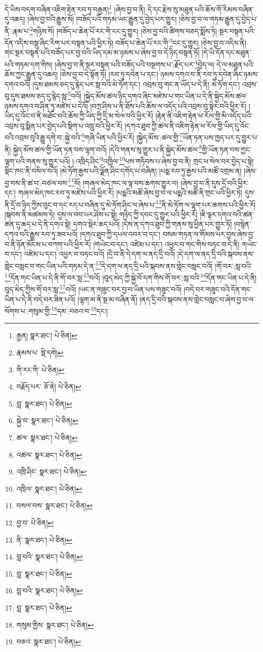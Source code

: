 དེ་ཡིས་བདག་བཞིན་འཇིག་རྟེན་རབ་ཏུ་བརྒྱན།\footnote{རྒྱན།  སྣར་ཐང་།  པེ་ཅིན། } །ཞེས་བྱ་བ་ནི། དེ་དང་རྗེས་སུ་མཐུན་པའི་ཆོས་གོ་རིམས་བཞིན་དུ་འཆད། །ཞེས་བྱ་བའི་རྒྱུས་སོ། །བཟོད་པའི་གཏམ་ཡང་རྒྱུན་དུ་བྱེད་པར་གྱུར། །ཅེས་བྱ་བ་ལ་གཏམ་རྒྱུན་དུ་བྱེད་པ་ནི་:རྣམ་པ་\footnote{རྣམས་པ་  སྡེ་དགེ། }གཉིས་སོ། །བཟོད་པ་ཆེན་པོ་རང་གི་ངང་དུ་གྱུར། །ཅེས་བྱ་བའི་ཚིགས་བཅད་སྨོས་ཏེ། སྔར་བསྟན་པའི་དོན་འདིས་བསྡུ་ཞིང་རིག་པར་བསྟན་པའི་ཕྱིར་ཏེ། བཟོད་པ་ཆེན་པོ་རང་གི་\footnote{གི་རང་གི་  པེ་ཅིན། }ངང་དུ་གྱུར། །ཅེས་བྱ་བ་འདིས་ནི། གང་སྔར་བསྟན་པའི་བཟོད་པར་བྱ་བའི་ཡིད་དམ་མ་ཉམས་པ་ཞེས་བྱ་བ་དེ་ཉིད་བསྟན་ཏོ། །དེ་ཡི་དོན་དང་མཐུན་པའི་གཏམ་དག་གིས། །ཞེས་བྱ་བ་ནི་སྔར་བསྟན་པའི་བཟོད་པའི་བསྔགས་པ་:རྗོད་པར་\footnote{བརྗོད་པར་  ཅོ་ནེ།  པེ་ཅིན། }བྱེད་ལ། དེ་ལ་མཐུན་པའི་ཆོས་ཀྱང་རྒྱུན་དུ་འཆད། །ཅེས་བྱ་བ་དེ་སྟོན་ཏོ། །རབ་ཏུ་དབེན་པ་དང་། ཉམས་དགའ་བ་ནི་རབ་ཏུ་དབེན་ཞིང་ཉམས་དགའ་བའོ། །དུས་ཐམས་ཅད་དུ་རྙེད་པར་སླ་བའི་མེ་ཏོག་དང་། འབྲས་བུ་གང་ན་ཡོད་པ་དེ་ནི། མེ་ཏོག་དང་། འབྲས་བུ་དུས་ཐམས་ཅད་དུ་རྙེད་སླ་\footnote{བླ་  སྣར་ཐང་།  པེ་ཅིན། }བའོ། །སྐྱེད་མོས་ཚལ་ཉིད་དགའ་ཞིང་མཛེས་པ་གང་ཡིན་པ་དེ་ནི་སྐྱེད་མོས་ཚལ་ཉམས་དགའ་བ་ཤིན་ཏུ་མཛེས་པ་དེའོ། །བཀྲ་ཤིས་པ་ནི་ཐོས་པའི་ཆོས་ལ་འདོད་པའི་འབྲས་བུ་སྟེར་བའི་ཕྱིར་རོ། །ཡིད་དུ་འོང་བ་ནི་མཐོང་བའི་ཆོས་ཀྱི་ཡིད་ཀྱི་དྲི་མ་སེལ་བའི་ཕྱིར་རོ། །རྟེན་ནི་འཇིག་རྟེན་ཕ་རོལ་གྱི་མི་འདོད་པའི་འབྲས་བུ་སྨིན་པར་བྱེད་པའི་སྡིག་པ་འཁྲུ་བའི་ཕྱིར་རོ། །དཀའ་ཐུབ་ཀྱི་ཚལ་ནི་འཇིག་རྟེན་ཕ་རོལ་གྱི་ཡིད་དུ་འོང་བའི་འབྲས་བུའི་རྒྱུ་དགེ་བ་:སྐྱེ་བའི་\footnote{སྐྱེ་བ་  སྣར་ཐང་།  པེ་ཅིན། }གཞི་ཡིན་པའི་ཕྱིར་རོ། །སྐྱེད་མོས་:ཚལ་གྱི་\footnote{ཚལ་  སྣར་ཐང་།  པེ་ཅིན། }ཡོན་ཏན་པས་ཁྱད་པར་དུ་གྱུར་པ་ནི། སྐྱེད་མོས་ཚལ་གྱི་ཡོན་ཏན་བས་ལྷག་བའོ། །དེའི་གནས་སུ་གྱུར་པ་ནི་སྐྱེད་མོས་ཚལ་\footnote{འཚལ་  སྣར་ཐང་།  པེ་ཅིན། }གྱི་ཡོན་ཏན་བས་ཀྱང་ལྷག་པའི་གནས་སུ་གྱུར་པའོ། །:འཁྲིད་ཤིང་\footnote{འཁྲི་ཤིང་  སྣར་ཐང་།  པེ་ཅིན། }འཁྱིལ་\footnote{འཁྲིལ་  སྣར་ཐང་།  པེ་ཅིན། }པས་གཏིབས་པ་ཞེས་བྱ་བ་ནི། གྲང་ཕ་སེལ་བར་བྱེད་པ་སྟེ། ལྡིང་ཁང་ནི་བསིལ་བའོ། །མེ་ཏོག་རྒྱས་པའི་ལྗོན་ཤིང་དགོད་པ་བཞིན། །པདྨ་རབ་ཏུ་རྒྱས་པའི་མཚོ་འགྲམ་ན། །ཞེས་བྱ་བས་ནི་ཚ་བ་:བཙལ་བས་\footnote{བསལ་བས་  སྣར་ཐང་།  པེ་ཅིན། }སོ། །གཞལ་མེད་ཁང་ལ་ལྟ་བས་ཆགས་གྱུར་བ། །ཞེས་བྱ་བ་ནི་དུས་དྲོ་བའི་ཕྱིར་དང་། གཞལ་མེད་ཁང་རབ་ཏུ་མཛེས་པའི་ཕྱིར་རོ། །པདྨའི་མཚོ་ཞེས་བྱ་བ་ལ་པདྨའི་མཚོ་ནི་གྲང་པའི་ཕྱིར་ཏེ། དུས་ནི་དྲོ་བ་ཉིད་ཀྱིས་བུང་བ་དང་རད་པ་བཞིན་དུ་མེ་ཏོག་ཤིང་ལ་ཞེས་པ་\footnote{བྱ་བ་  པེ་ཅིན། }ནི་མེ་ཏོག་ལ་ལྷག་པར་ཆགས་པའི་ཕྱིར་རོ། །སྐབས་ནི་མཚམས་ཏེ། དུས་ལ་བབ་པར་ཤེས་པ་སྟེ། གཉིད་ཀྱི་དབང་དུ་གྱུར་པའི་ཕྱིར་རོ། །ཇི་ལྟར་དགའ་བའི་ཚན་ཚན་དུ་ཆད་པ་དེ་ནི་དགའ་སྟེ། དགའ་སྡེར་ཆད་པའོ། །དེས་ན་དཀའ་ཐུབ་ཀྱི་གནས་སུ་ཕྱིན་པར་གྱུར་ཏོ། །བསྙེན་དཀའ་བའི་རྒྱུས་རབ་ཏུ་ཟབ་པའོ། །དཀའ་ཐུབ་ཀྱི་དཔལ་འབར་བ་དང་། བསམ་གཏན་ལ་གོམས་པར་བྱས་ཞེས་བྱ་བ་ནི་ཉོན་མོངས་པ་བཀག་པའི་ཕྱིར་རོ། །གཡེང་བ་དང་། འཛེམ་པ་དང་། འཕྱར་བ་གང་གིས་བཏང་བ་དེ་ནི། གཡེང་བ་དང་། འཛེམ་པ་དང་། འཕྱར་བ་བཏང་བའོ། །དྲི་བ་ནི་དེ་དག་ལ་ནད་དྲི་བའོ། །དེ་དག་ལ་ནད་དྲི་བའི་སྐབས་ནས་གླེང་བསླང་བ་གང་ཡིན་པའི་གཏམ་དེ་ན་\footnote{ནི་  སྣར་ཐང་།  པེ་ཅིན། }དེ་དག་ལ་ནད་དྲི་པའི་སྐབས་ནས་གླེང་བསླང་བའོ། །གོ་བར་:སླ་བའི་\footnote{བླ་བའི་  སྣར་ཐང་།  པེ་ཅིན། }དོན་གང་ཡིན་པ་དེ་ནི་གོ་བར་སླ་\footnote{བླ་  སྣར་ཐང་།  པེ་ཅིན། }བའོ། །བུད་མེད་ཀྱི་སྐྱེ་བོ་དག་གིས་གོ་བར་:སླ་བའི་\footnote{བླ་བའི་  སྣར་ཐང་།  པེ་ཅིན། }དོན་གང་ཡིན་པ་དེ་ནི། བུད་མེད་ཀྱིས་གོ་བར་སླ་\footnote{བླ་  སྣར་ཐང་།  པེ་ཅིན། }བའོ། །ཡང་ན་གཟུང་བར་བྱ་བ་ཡིན་པས་གཟུང་བའོ། །བདེ་བར་གཟུང་བའི་དོན་གང་ཡིན་པ་དེ་ནི་བདེ་བར་ཟིན་པའོ། །ལྷག་མ་ནི་སྔ་མ་བཞིན་ནོ། །ནད་དྲི་བའི་སྐབས་ནས་གླེང་བསླང་བ་ཞེས་བྱ་བ་ལ་སོགས་པ་:གསུམ་གྱི་\footnote{གསུམ་གྱིས་  སྣར་ཐང་།  པེ་ཅིན། }དམ་:བཅའ་བ་\footnote{བཅའ་  སྣར་ཐང་།  པེ་ཅིན། }དང་། 